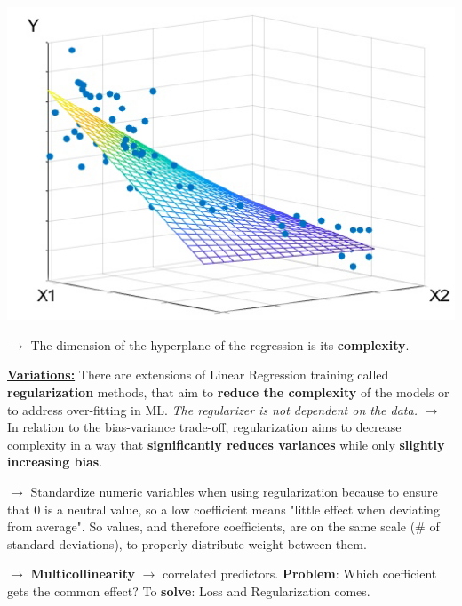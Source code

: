 \documentclass[letterpaper, 10.5pt,landscape]{article}
\begin{document}
\begin{multicols*}{3}
\begin{center}
    \begin{minipage}{0.60\linewidth}
        \includegraphics[width=\textwidth]{figures/hyperplane_linear_regression.PNG}
    \end{minipage}   
\end{center}


\vspace{-5pt}

$\rightarrow$ The dimension of the hyperplane of the regression is its \textbf{complexity}.


\vspace{3pt}

\textbf{\underline{Variations:}} 
There are extensions of Linear Regression training called \textbf{regularization}
methods, that aim to \textbf{reduce the complexity} of the models or to address over-fitting in ML. \textit{The regularizer is not dependent on the data.}
$\rightarrow$ In relation to the bias-variance trade-off, regularization aims to decrease complexity in a way that \textbf{significantly reduces variances} while only \textbf{slightly increasing bias}. 


$\rightarrow$ Standardize numeric variables when using regularization because to ensure that 0 is a neutral value, so a low coefficient means "little effect when deviating from average". So values, and therefore coefficients, are on the same scale (\# of standard deviations), to properly distribute weight between them.

$\rightarrow$ \textbf{Multicollinearity} $\rightarrow$ correlated predictors. \textbf{Problem}: Which coefficient gets the common effect? To \textbf{solve}: Loss and Regularization comes. \\



\end{multicols*}
\end{document}
